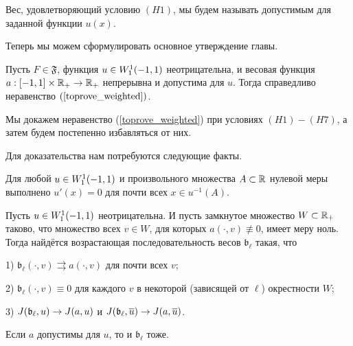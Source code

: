 \bigskip

Вес, удовлетворяющий условию $(H1)$, мы будем называть допустимым для заданной функции $u(x)$.

\medskip

Теперь мы можем сформулировать основное утверждение главы.
\begin{thm}
\label{unbounded_growth_thm}
Пусть $F \in \mathfrak{F}$, функция $u \in W_1^1(-1, 1)$ неотрицательна,
и весовая функция $a: [-1, 1] \times \mathbb R_+ \to \mathbb R_+$ непрерывна
и допустима для $u$.
Тогда справедливо неравенство $(\ref{toprove_weighted})$.
\end{thm}

Мы докажем неравенство (\ref{toprove_weighted}) при условиях $(H1)-(H7)$,
а затем будем постепенно избавляться от них.

Для доказательства нам потребуются следующие факты.

\begin{prop}
\label{levelDerivative}
\textrm{\cite[Theorem 6.19]{LiebLoss} }
Для любой $u \in W_1^1(-1, 1)$ и произвольного множества $A \subset \mathbb R$ нулевой меры выполнено
$u'(x) = 0$ для почти всех $x \in u^{-1}(A)$.
\end{prop}

\begin{lm}
\label{zeroApprox}
Пусть $u \in W_1^1(-1, 1)$ неотрицательна.
И пусть замкнутое множество $W \subset \mathbb R_+$ таково, что множество всех $v \in W$, для которых $a(\cdot, v) \not\equiv 0$, имеет меру ноль.
Тогда найдётся возрастающая последовательность весов $\mathfrak b_{\ell}$ такая, что

1) $\mathfrak b_{\ell}(\cdot, v) \rightrightarrows a(\cdot, v)$ для почти всех $v$;

2) $\mathfrak b_{\ell}(\cdot, v) \equiv 0$ для каждого $v$ в некоторой (зависящей от $\ell$) окрестности $W$;

3) $J(\mathfrak b_{\ell}, u) \to J(a, u)$ и $\IWg(\mathfrak b_{\ell}, \mon{u}) \to \IWg(a, \mon{u})$.
\end{lm}

\begin{rem}
Если $a$ допустимы для $u$, то и $\mathfrak b_{\ell}$ тоже.
\end{rem}

